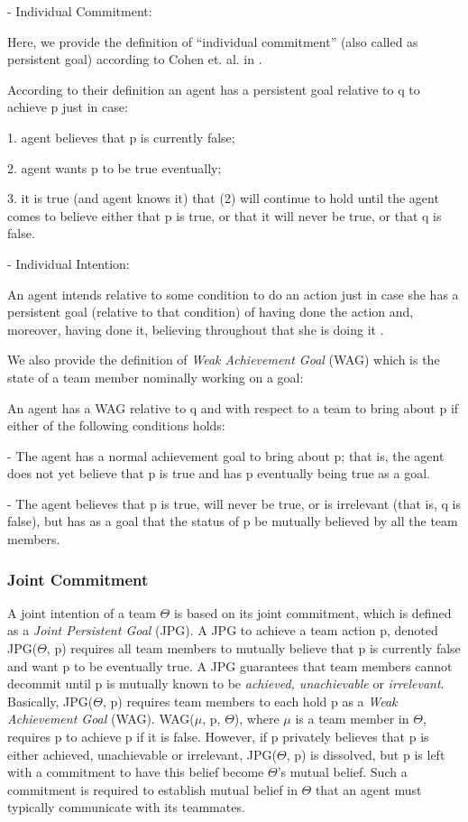 \documentclass[11pt]{article}
\begin{document}
- Individual Commitment:

Here, we provide the definition of ``individual commitment'' (also called
as persistent goal) according to Cohen et. al. in \cite{cohen:team-formation}. 

According to their definition an agent has a persistent goal relative to q to
achieve p just in case:

1. agent believes that p is currently false;

2. agent wants p to be true eventually;

3. it is true (and agent knows it) that (2) will continue to hold until the
agent comes to believe either that p is true, or that it will never be true, or
that q is false.

- Individual Intention:

An agent intends relative to some condition to do an action just in case she has
a persistent goal (relative to that condition) of having done the action and,
moreover, having done it, believing throughout that she is doing it
\cite{cohen:teamwork}.


We also provide the definition of \textit{Weak Achievement Goal} (WAG) which is
the state of a team member nominally working on a goal:

An agent has a WAG relative to q and with respect to a team to bring about p if
either of the following conditions holds:

- The agent has a normal achievement goal to bring about p; that is, the agent
does not yet believe that p is true and has p eventually being true as a goal.

- The agent believes that p is true, will never be true, or is irrelevant (that
is, q is false), but has as a goal that the status of p be mutually believed by
all the team members.

\subsubsection{Joint Commitment}
\label{sec:jpg}

A joint intention of a team $\Theta$ is based on its joint commitment, which is
defined as a \textit{Joint Persistent Goal} (JPG). A JPG to achieve a team
action p, denoted JPG($\Theta$, p) requires all team members to mutually believe
that p is currently false and want p to be eventually true. A JPG guarantees
that team members cannot decommit until p is mutually known to be
\textit{achieved, unachievable} or \textit{irrelevant}. Basically, JPG($\Theta$,
p) requires team members to each hold p as a \textit{Weak Achievement Goal}
(WAG). WAG($\mu$, p, $\Theta$), where $\mu$ is a team member in $\Theta$,
requires p to achieve p if it is false. However, if p privately believes that p
is either achieved, unachievable or irrelevant, JPG($\Theta$, p) is dissolved,
but p is left with a commitment to have this belief become $\Theta$'s mutual
belief. Such a commitment is required to establish mutual belief in $\Theta$
that an agent must typically communicate with its teammates.
\end{document}
